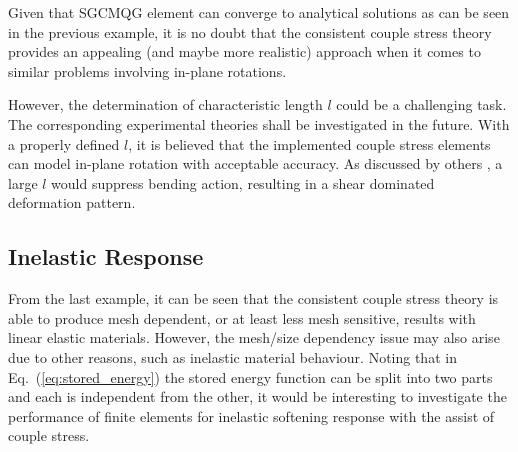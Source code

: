 \documentclass[3p,sort&compress,11pt,fleqn,review]{elsarticle}
\newcommand*{\eqsref}[1]{Eq.~(\ref{#1})}
\begin{document}
Given that SGCMQG element can converge to analytical solutions as can be seen in the previous example, it is no doubt that the consistent couple stress theory provides an appealing (and maybe more realistic) approach when it comes to similar problems involving in-plane rotations.

However, the determination of characteristic length $l$ could be a challenging task. The corresponding experimental theories shall be investigated in the future. With a properly defined $l$, it is believed that the implemented couple stress elements can model in-plane rotation with acceptable accuracy. As discussed by others \citep[e.g.,][]{Darrall2013}, a large $l$ would suppress bending action, resulting in a shear dominated deformation pattern.
\subsection{Inelastic Response}
From the last example, it can be seen that the consistent couple stress theory is able to produce mesh dependent, or at least less mesh sensitive, results with linear elastic materials. However, the mesh/size dependency issue may also arise due to other reasons, such as inelastic material behaviour. Noting that in \eqsref{eq:stored_energy} the stored energy function can be split into two parts and each is independent from the other, it would be interesting to investigate the performance of finite elements for inelastic softening response with the assist of couple stress.
\end{document}
